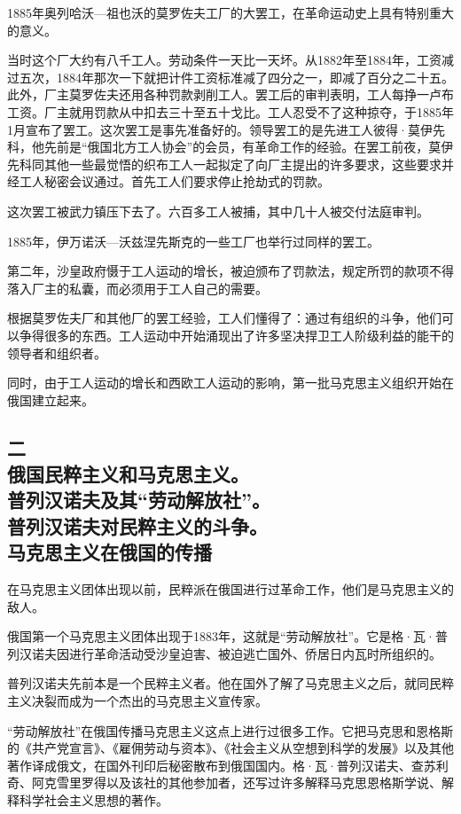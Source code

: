 1885年奥列哈沃—祖也沃的莫罗佐夫工厂的大罢工，在革命运动史上具有特别重大的意义。

当时这个厂大约有八千工人。劳动条件一天比一天坏。从1882年至1884年，工资减过五次，1884年那次一下就把计件工资标准减了四分之一，即减了百分之二十五。此外，厂主莫罗佐夫还用各种罚款剥削工人。罢工后的审判表明，工人每挣一卢布工资。厂主就用罚款从中扣去三十至五十戈比。工人忍受不了这种掠夺，于1885年1月宣布了罢工。这次罢工是事先准备好的。领导罢工的是先进工人彼得·莫伊先科，他先前是“俄国北方工人协会”的会员，有革命工作的经验。在罢工前夜，莫伊先科同其他一些最觉悟的织布工人一起拟定了向厂主提出的许多要求，这些要求并经工人秘密会议通过。首先工人们要求停止抢劫式的罚款。

这次罢工被武力镇压下去了。六百多工人被捕，其中几十人被交付法庭审判。

1885年，伊万诺沃—沃兹涅先斯克的一些工厂也举行过同样的罢工。

第二年，沙皇政府慑于工人运动的增长，被迫颁布了罚款法，规定所罚的款项不得落入厂主的私囊，而必须用于工人自己的需要。

根据莫罗佐夫厂和其他厂的罢工经验，工人们懂得了：通过有组织的斗争，他们可以争得很多的东西。工人运动中开始涌现出了许多坚决捍卫工人阶级利益的能干的领导者和组织者。

同时，由于工人运动的增长和西欧工人运动的影响，第一批马克思主义组织开始在俄国建立起来。

\subsection[二\q 俄国民粹主义和马克思主义。普列汉诺夫及其“劳动解放社”。普列汉诺夫对民粹主义的斗争。马克思主义在俄国的传播]{二\\ 俄国民粹主义和马克思主义。\\ 普列汉诺夫及其“劳动解放社”。\\ 普列汉诺夫对民粹主义的斗争。\\ 马克思主义在俄国的传播}

在马克思主义团体出现以前，民粹派在俄国进行过革命工作，他们是马克思主义的敌人。

俄国第一个马克思主义团体出现于1883年，这就是“劳动解放社”。它是格·瓦·普列汉诺夫因进行革命活动受沙皇迫害、被迫逃亡国外、侨居日内瓦时所组织的。

普列汉诺夫先前本是一个民粹主义者。他在国外了解了马克思主义之后，就同民粹主义决裂而成为一个杰出的马克思主义宣传家。

“劳动解放社”在俄国传播马克思主义这点上进行过很多工作。它把马克思和恩格斯的《共产党宣言》、《雇佣劳动与资本》、《社会主义从空想到科学的发展》以及其他著作译成俄文，在国外刊印后秘密散布到俄国国内。格·瓦·普列汉诺夫、查苏利奇、阿克雪里罗得以及该社的其他参加者，还写过许多解释马克思恩格斯学说、解释科学社会主义思想的著作。

